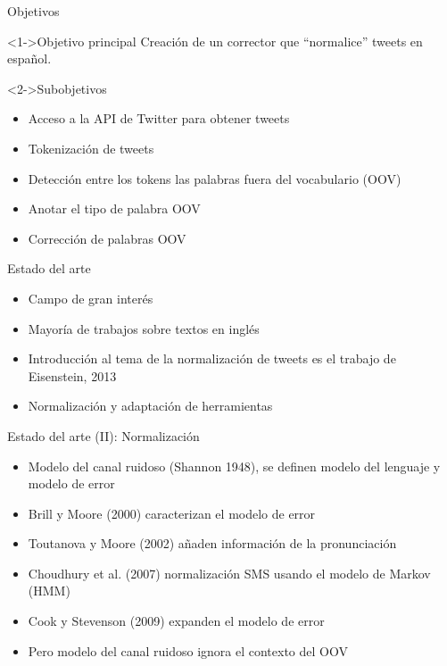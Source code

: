 \begin{tframe}{Objetivos}
	\begin{block}<1->{Objetivo principal}
		Creaci\'on de un corrector que ``normalice'' tweets en espa\~nol.
	\end{block}
	\begin{block}<2->{Subobjetivos}
		\begin{itemize}
			\item Acceso a la API de Twitter para obtener tweets
			\item Tokenizaci\'on de tweets
			\item Detecci\'on entre los tokens las palabras fuera del vocabulario (OOV)
			\item Anotar el tipo de palabra OOV
			\item Correcci\'on de palabras OOV
		\end{itemize}
	\end{block}
\end{tframe}	

\begin{tframe}{Estado del arte}
	\begin{itemize}
		\item Campo de gran inter\'es
		\item Mayor\'ia de trabajos sobre textos en ingl\'es
		\item Introducci\'on al tema de la normalizaci\'on de tweets es el trabajo de Eisenstein, 2013
		\item Normalizaci\'on y adaptaci\'on de herramientas
	\end{itemize}
\end{tframe}

\begin{tframe}{Estado del arte (II): Normalizaci\'on}
	\begin{itemize}
		\item Modelo del canal ruidoso (Shannon 1948), se definen modelo del lenguaje y modelo de error
		\item Brill y Moore (2000) caracterizan el modelo de error
		\item Toutanova y Moore (2002) a\~naden informaci\'on de la pronunciaci\'on
		\item Choudhury et al. (2007) normalizaci\'on SMS usando el modelo de Markov (HMM)
		\item<+-> Cook y Stevenson (2009) expanden el modelo de error 
		\item<+-| alert@+> Pero modelo del canal ruidoso ignora el contexto del OOV
	\end{itemize}	
\end{tframe}

